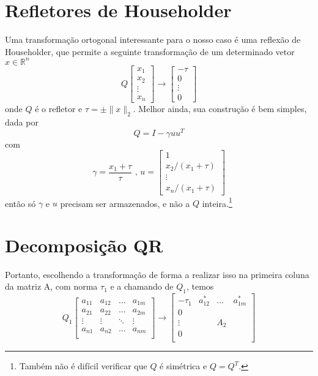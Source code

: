 \documentclass[a4paper,11pt]{article}
\begin{document}
    \section*{Refletores de Householder}

        Uma transformação ortogonal interessante para o nosso caso é uma reflexão de Householder, que permite a seguinte transformação de um determinado
        vetor $x \in \mathbb{R}^n$
        $$ Q\begin{bmatrix}
                x_1 \\
                x_2 \\
                \vdots \\
                x_n
            \end{bmatrix}
            \rightarrow
            \begin{bmatrix}
                -\tau  \\
                0      \\
                \vdots \\
                0
            \end{bmatrix}$$
        onde $Q$ é o refletor e $\tau = \pm \|x\|_2$.
        Melhor ainda, sua construção é bem simples, dada por
        $$ Q = I - \gamma u u^T $$
        com
        $$
            \gamma = \frac{x_1 + \tau}{\tau}\text{ , }
            u =
            \begin{bmatrix}
                1 \\
                x_2/(x_1+\tau) \\
                \vdots         \\
                x_n/(x_1+\tau)
            \end{bmatrix}
        $$
        então só $\gamma$ e $u$ precisam ser armazenados, e não a $Q$ inteira.\footnote{Também não é difícil verificar que $Q$ é simétrica e $Q = Q^T$.}

    \section*{Decomposição QR}
        Portanto, escolhendo a transformação de forma a realizar isso na primeira coluna da matriz A, com norma $\tau_1$ e a chamando de $Q_1$, temos
        $$ Q_1
        \begin{bmatrix}
            a_{11} & a_{12} & \dots & a_{1m} \\
            a_{21} & a_{22} & \dots & a_{2m} \\
            \vdots & \vdots & \ddots & \vdots \\
            a_{n1} & a_{n2} & \dots & a_{nm} \\
        \end{bmatrix}
        \rightarrow
        \left[
        \begin{array}{c|ccc}
            -\tau_1  & a_{12}^* & \dots & a_{1m}^* \\ \hline
                  0 &  &  &  \\
            \vdots &  & A_2 &  \\
                  0 &  &  &  \\
        \end{array}\right] $$
\end{document}

